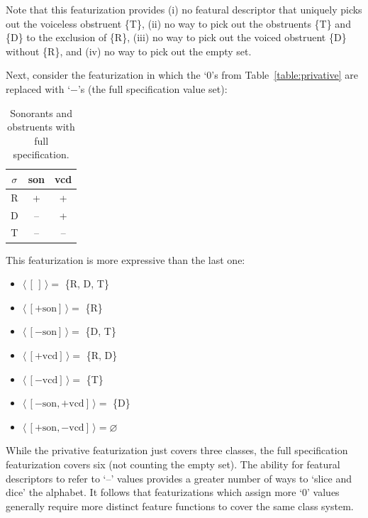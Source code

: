 \documentclass[11pt, oneside]{article}   	%
\begin{document}
\noindent Note that this featurization provides (i) no featural descriptor that uniquely picks out the voiceless obstruent \{T\}, (ii) no way to pick out the obstruents \{T\} and \{D\} to the exclusion of \{R\}, (iii) no way to pick out the voiced obstruent \{D\} without \{R\}, and (iv) no way to pick out the empty set.

Next, consider the featurization in which the `$0$'s from Table~\ref{table:privative} are replaced with `$-$'s (the full specification value set):

\begin{table}[h]
    \centering
    \begin{tabular} {|c||c|c|}
    \hline
        $\sigma$ & son & vcd \\ \hline
        R & + & + \\
        D & -- & + \\
        T & -- & -- \\
        \hline
    \end{tabular}
    \caption{Sonorants and obstruents with full specification.}
    \label{table:full}
\end{table}

\noindent This featurization is more expressive than the last one: \begin{itemize}
    \item $\langle \, [\,] \, \rangle =$ \{R, D, T\}
    \item $\langle \, [+\text{son}] \, \rangle =$ \{R\}
    \item $\langle \, [-\text{son}] \, \rangle =$ \{D, T\}
    \item $\langle \, [+\text{vcd}] \, \rangle =$ \{R, D\}
    \item $\langle \, [-\text{vcd}]  \, \rangle=$ \{T\}
    \item $\langle \, [-\text{son},+\text{vcd}] \, \rangle =$ \{D\}
    \item $\langle \, [+\text{son},-\text{vcd}] \, \rangle = \varnothing$
    \end{itemize}

\vspace{\baselineskip} \noindent While the privative featurization just covers three classes, the full specification featurization covers six (not counting the empty set). The ability for featural descriptors to refer to `--' values provides a greater number of ways to `slice and dice' the alphabet. It follows that featurizations which assign more `$0$' values generally require more distinct feature functions to cover the same class system.
\end{document}
